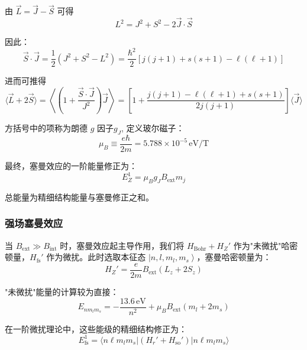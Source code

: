 由 \( \vec{L} = \vec{J} - \vec{S} \) 可得 
\[L^2 = J^2 + S^2 - 2\vec{J} \cdot \vec{S} \] 

因此：
\begin{equation}
	\vec{S} \cdot \vec{J} = \frac{1}{2} \left( J^2 + S^2 - L^2 \right) = \frac{\hbar^2}{2} \left[ j(j+1) + s(s+1) - \ell(\ell+1) \right]
\end{equation}

进而可推得
\begin{equation}
	\langle \vec{L} + 2\vec{S} \rangle = \left\langle \left( 1 + \frac{\vec{S} \cdot \vec{J}}{J^2} \right) \vec{J} \right\rangle = \left[ 1 + \frac{j(j+1) - \ell(\ell+1) + s(s+1)}{2j(j+1)} \right] \langle \vec{J} \rangle
\end{equation}

方括号中的项称为朗德 \( g \) 因子\( g_J \), 定义玻尔磁子：
\begin{equation}
	\mu_B \equiv \frac{e\hbar}{2m} = 5.788 \times 10^{-5} \, \text{eV/T}
\end{equation}

最终，塞曼效应的一阶能量修正为：
\begin{equation}
	E_Z^1 = \mu_B g_J B_{\text{ext}} m_j
\end{equation}

总能量为精细结构能量与塞曼修正之和。

\subsubsection{强场塞曼效应}

当 \( B_{\text{ext}} \gg B_{\text{int}} \) 时，塞曼效应起主导作用，我们将 \( H_{\text{Bohr}} + H_Z' \) 作为"未微扰"哈密顿量，\( H_{\text{fs}}' \) 作为微扰。此时选取本征态 $\left| {n,l,{m_l},{m_s}} \right\rangle $，塞曼哈密顿量为：
\begin{equation}
	H_Z' = \frac{e}{2m} B_{\text{ext}} (L_z + 2S_z)
\end{equation}

"未微扰"能量的计算较为直接：
\begin{equation}
	E_{n m_l m_s} = -\frac{13.6 \, \text{eV}}{n^2} + \mu_B B_{\text{ext}} (m_l + 2m_s)
\end{equation}

在一阶微扰理论中，这些能级的精细结构修正为：
\begin{equation}
	E_{\text{fs}}^1 = \langle n\ell m_l m_s | (H_r' + H_{\text{so}}') | n\ell m_l m_s \rangle
\end{equation}

